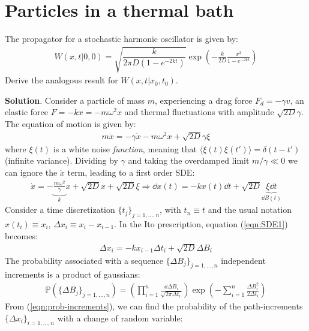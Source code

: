 \documentclass[../template.tex]{subfiles}
\begin{document}
\chapter{Particles in a thermal bath} %
\begin{exo}
    The propagator for a stochastic harmonic oscillator is given by:
    \begin{align*}
        W(x,t|0,0) = \sqrt{\dfrac{k}{2 \pi D (1- e^{-2kt})} } \exp\left(-\frac{k}{2D} \frac{x^2}{1-e^{-2kt}}  \right)
    \end{align*}
    Derive the analogous result for $W(x,t|x_0,t_0)$.
    \medskip

    \textbf{Solution}. Consider a particle of mass $m$, experiencing a drag force $F_d = -\gamma v$, an elastic force $F=-kx = -m \omega^2 x$ and thermal fluctuations with amplitude $\sqrt{2 D} \gamma$. The equation of motion is given by:
    \begin{align*}
        m \ddot{x} = - \gamma \dot{x} - m \omega^2 x + \sqrt{2D} \gamma \xi
    \end{align*}
    where $\xi(t)$ is a white noise \textit{function}, meaning that $\langle \xi(t) \xi(t') \rangle = \delta(t-t')$ (infinite variance). Dividing by $\gamma$ and taking the overdamped limit $m/\gamma \ll 0$ we can ignore the $\ddot{x}$ term, leading to a first order SDE:
    \begin{align}
        \dot{x} = -\underbrace{\frac{m \omega^2}{\gamma}}_{k}x + \sqrt{2D} x+ \sqrt{2D} \xi \Rightarrow \dd{x(t)} = - kx(t)\dd{t} + \sqrt{2D} \underbrace{\xi \dd{t}}_{\dd{B(t)}}  \label{eqn:SDE1}
    \end{align}
    Consider a time discretization $\{t_j\}_{j=1,\dots,n}$, with $t_n \equiv t$ and the usual notation $x(t_i) \equiv x_i$, $\Delta x_i \equiv x_i - x_{i-1}$. In the Ito prescription, equation (\ref{eqn:SDE1}) becomes:
    \begin{align*}
        \Delta x_i = - kx_{i-1} \Delta t_i + \sqrt{2D} \Delta B_i
    \end{align*}
    The probability associated with a sequence $\{\Delta B_j\}_{j=1,\dots,n}$ independent increments is a product of gaussians:
    \begin{align} \label{eqn:prob-increments}
        \mathbb{P}(\{\Delta B_j\}_{j=1,\dots,n}) = \left( \prod_{i=1}^n \frac{\dd{\Delta B_i}}{\sqrt{2 \pi \Delta t_i}} \right) \exp\left(-\sum_{i=1}^n \frac{\Delta B_i^2}{2 \Delta t_i} \right) 
    \end{align}
    From (\ref{eqn:prob-increments}), we can find the probability of the path-increments $\{ \Delta x_i\}_{i=1,\dots,n}$ with a change of random variable:

\end{exo}
\end{document}
